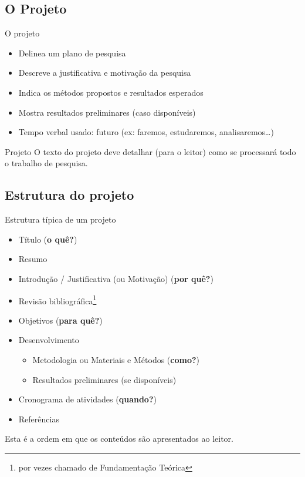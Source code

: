 \documentclass{beamer}
\begin{document}
\subsection{O Projeto}

\begin{frame}{O projeto}
  \begin{itemize}
  \item Delinea um \alert{plano} de pesquisa
  \item Descreve a justificativa e motivação da pesquisa
  \item Indica os métodos propostos e resultados esperados
  \item Mostra resultados preliminares (caso disponíveis)
  \item Tempo verbal usado: \alert{futuro} (ex: faremos, estudaremos,
    analisaremos\ldots)
  \end{itemize}
\end{frame}

\begin{frame}
  \begin{block}{Projeto}
    O texto do projeto deve detalhar (para o leitor) como se processará
    todo o trabalho de pesquisa.
  \end{block}
\end{frame}

\subsection{Estrutura do projeto}

\begin{frame}{Estrutura típica de um projeto}
  \begin{itemize}
  \item Título (\alert{{\bf o quê?}})
  \item Resumo
  \item Introdução / Justificativa (ou Motivação) (\alert{{\bf por quê?}})
  \item Revisão bibliográfica\footnote{por vezes chamado
      de Fundamentação Teórica}
  \item Objetivos (\alert{{\bf para quê?}})
  \item Desenvolvimento
    \begin{itemize}
    \item Metodologia ou Materiais e Métodos (\alert{{\bf como?}})
    \item Resultados preliminares (se disponíveis)
    \end{itemize}
  \item Cronograma de atividades (\alert{{\bf quando?}})
  \item Referências
  \end{itemize}

\vfill
  Esta é a ordem em que os conteúdos são apresentados ao leitor.
\end{frame}
\end{document}
